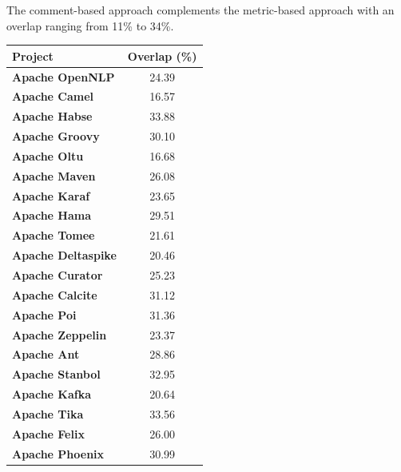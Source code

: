{\begin{myboxii}
	The comment-based approach complements the metric-based approach with an overlap ranging from 11\% to 34\%.
\end{myboxii}

	\begin{table}[!htbp]
	\small
	\centering
	
	\begin{tabular}{l|c}
		\hline
		\textbf{Project}           & \textbf{Overlap (\%)} \\ \hline
		\textbf{Apache OpenNLP}    &    24.39     \\ \hline
		\textbf{Apache Camel}      &    16.57     \\ \hline
		\textbf{Apache Habse}      &    33.88     \\ \hline
		\textbf{Apache Groovy}     &    30.10     \\ \hline
		\textbf{Apache Oltu}       &    16.68     \\ \hline
		\textbf{Apache Maven}      &    26.08     \\ \hline
		\textbf{Apache Karaf}      &    23.65     \\ \hline
		\textbf{Apache Hama}       &    29.51     \\ \hline
		\textbf{Apache Tomee}      &    21.61     \\ \hline
		\textbf{Apache Deltaspike} &    20.46     \\ \hline
		\textbf{Apache Curator}    &    25.23     \\ \hline
		\textbf{Apache Calcite}    &    31.12     \\ \hline
		\textbf{Apache Poi}        &    31.36     \\ \hline
		\textbf{Apache Zeppelin}   &    23.37     \\ \hline
		\textbf{Apache Ant}        &    28.86     \\ \hline
		\textbf{Apache Stanbol}    &    32.95     \\ \hline
		\textbf{Apache Kafka}      &    20.64     \\ \hline
		\textbf{Apache Tika}       &    33.56     \\ \hline
		\textbf{Apache Felix}      &    26.00     \\ \hline
		\textbf{Apache Phoenix}    &    30.99     \\ \hline
	\end{tabular}
	\quad \quad \quad
	\begin{tabular}{l|c}
		\hline

\end{tabular}
\end{table}}
